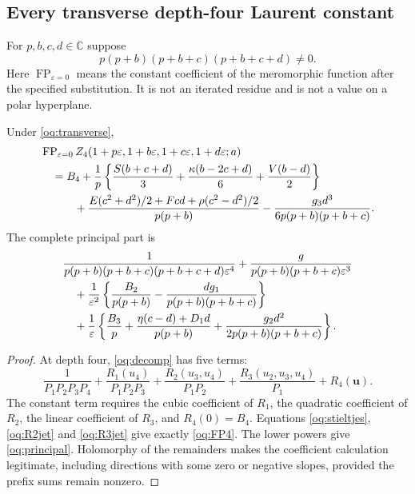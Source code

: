 \subsection{Every transverse depth-four Laurent constant}

For $p,b,c,d\in\mathbb C$ suppose
\begin{equation}\label{oq:transverse}
 p(p+b)(p+b+c)(p+b+c+d)\ne0.
\end{equation}
Here $\operatorname{FP}_{\varepsilon=0}$ means the constant coefficient
of the meromorphic function after the specified substitution. It is not
an iterated residue and is not a value on a polar hyperplane.

\begin{theorem}\label{oq:main}
Under \eqref{oq:transverse},
\begin{align}\label{oq:FP4}
 &\operatorname{FP}_{\varepsilon=0}
 Z_4(1+p\varepsilon,1+b\varepsilon,1+c\varepsilon,1+d\varepsilon;a)
 \notag\\
 &\quad=B_4+
 \frac1p\left\{\frac{S(b+c+d)}3+
            \frac{\kappa(b-2c+d)}6+\frac{V(b-d)}2\right\}
 \notag\\
 &\qquad\quad+
 \frac{E(c^2+d^2)/2+Fcd+\rho(c^2-d^2)/2}{p(p+b)}
 -\frac{g_3d^3}{6p(p+b)(p+b+c)}.
\end{align}
The complete principal part is
\begin{align}\label{oq:principal}
 &\frac{1}{p(p+b)(p+b+c)(p+b+c+d)\varepsilon^4}
 +\frac{g}{p(p+b)(p+b+c)\varepsilon^3}
 \notag\\
 &\quad+\frac1{\varepsilon^2}
 \left\{\frac{B_2}{p(p+b)}-
 \frac{dg_1}{p(p+b)(p+b+c)}\right\}
 \notag\\
 &\quad+\frac1\varepsilon
 \left\{\frac{B_3}p+
 \frac{\eta(c-d)+D_1d}{p(p+b)}+
 \frac{g_2d^2}{2p(p+b)(p+b+c)}\right\}.
\end{align}
\end{theorem}
\begin{proof}
At depth four, \eqref{oq:decomp} has five terms:
\[
 \frac1{P_1P_2P_3P_4}+
 \frac{R_1(u_4)}{P_1P_2P_3}+
 \frac{R_2(u_3,u_4)}{P_1P_2}+
 \frac{R_3(u_2,u_3,u_4)}{P_1}+R_4(\mathbf u).
\]
The constant term requires the cubic coefficient of $R_1$, the quadratic
coefficient of $R_2$, the linear coefficient of $R_3$, and $R_4(0)=B_4$.
Equations \eqref{oq:stieltjes}, \eqref{oq:R2jet} and \eqref{oq:R3jet}
give exactly \eqref{oq:FP4}. The lower powers give
\eqref{oq:principal}. Holomorphy of the remainders makes the coefficient
calculation legitimate, including directions with some zero or negative
slopes, provided the prefix sums remain nonzero.
\end{proof}

